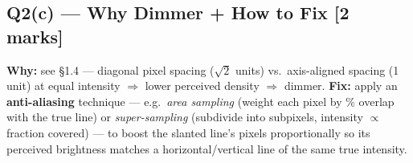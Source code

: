 \documentclass[12pt, a4paper]{article}
\newenvironment{answerbox}{\begin{mdframed}[style=answerframe]}{\end{mdframed}}
\begin{document}
\subsection*{Q2(c) --- Why Dimmer + How to Fix [2 marks]}
\begin{answerbox}
\textbf{Why:} see \S1.4 --- diagonal pixel spacing ($\sqrt2$ units) vs.\ axis-aligned spacing (1 unit) at equal intensity $\Rightarrow$ lower perceived density $\Rightarrow$ dimmer. \textbf{Fix:} apply an \textbf{anti-aliasing} technique --- e.g.\ \emph{area sampling} (weight each pixel by \% overlap with the true line) or \emph{super-sampling} (subdivide into subpixels, intensity $\propto$ fraction covered) --- to boost the slanted line's pixels proportionally so its perceived brightness matches a horizontal/vertical line of the same true intensity.
\end{answerbox}
\end{document}
